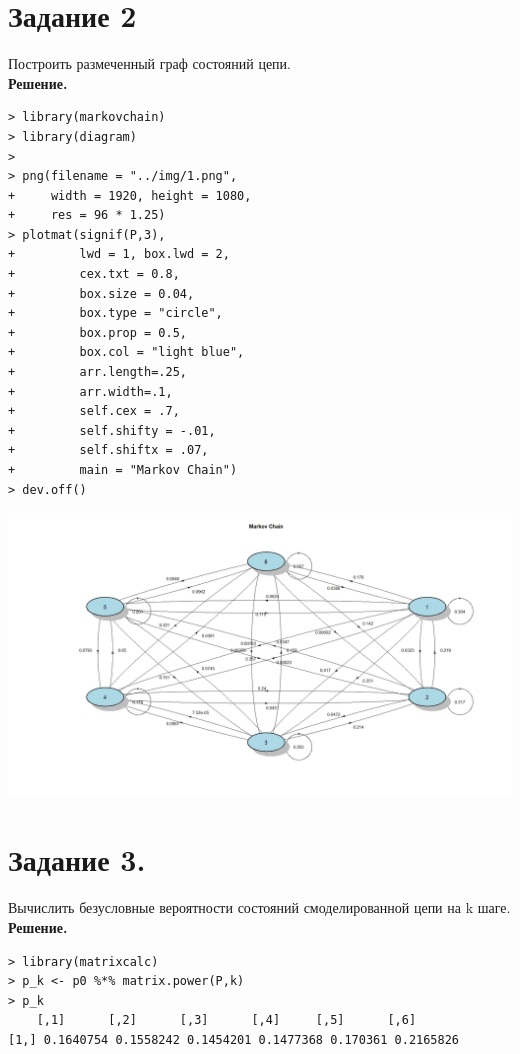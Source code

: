 \documentclass[14pt,a4paper]{scrartcl}
\begin{document}
\pagebreak
\section*{Задание 2}
Построить размеченный граф состояний цепи.\\
\textbf{Решение.}\\

\begin{verbatim}
> library(markovchain)
> library(diagram)
> 
> png(filename = "../img/1.png",
+     width = 1920, height = 1080,
+     res = 96 * 1.25)
> plotmat(signif(P,3), 
+         lwd = 1, box.lwd = 2, 
+         cex.txt = 0.8, 
+         box.size = 0.04, 
+         box.type = "circle", 
+         box.prop = 0.5,
+         box.col = "light blue",
+         arr.length=.25,
+         arr.width=.1,
+         self.cex = .7,
+         self.shifty = -.01,
+         self.shiftx = .07,
+         main = "Markov Chain")
> dev.off()
\end{verbatim}

\includegraphics[angle=90,origin=t, scale=0.75]{../img/1.png}

\pagebreak

\section*{Задание 3.}
Вычислить безусловные вероятности состояний смоделированной цепи на k шаге.\\
\textbf{Решение.}\\

\begin{verbatim}
> library(matrixcalc)
> p_k <- p0 %*% matrix.power(P,k)
> p_k
	[,1]      [,2]      [,3]      [,4]     [,5]      [,6]
[1,] 0.1640754 0.1558242 0.1454201 0.1477368 0.170361 0.2165826
\end{verbatim}
\end{document}
